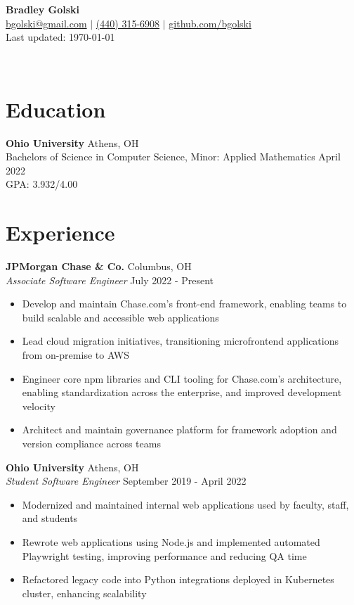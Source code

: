 \documentclass[11pt,a4paper]{article}
\newcommand{\sectionspace}{\vspace{1mm}}
\begin{document}
\begin{center}
	\begin{minipage}[t]{0.7\textwidth}
		{\Huge \textbf{Bradley Golski}}\\[5pt]
		\href{mailto:bgolski@gmail.com}{bgolski@gmail.com} $|$
		\href{tel:+4403156908}{(440) 315-6908} $|$
		\href{https://github.com/bgolski}{github.com/bgolski}\\[2pt]
		{\small\color{gray}Last updated: \today}
	\end{minipage}%
	\begin{minipage}[t]{0.3\textwidth}
		\raggedleft
		\\[2pt]
	\end{minipage}
\end{center}
\vspace{0.5mm}

\section{Education}
\sectionspace
\textbf{Ohio University} \hfill Athens, OH\\
Bachelors of Science in Computer Science, Minor: Applied Mathematics \hfill April 2022\\
GPA: 3.932/4.00

\section{Experience}
\sectionspace
\textbf{JPMorgan Chase \& Co.} \hfill Columbus, OH\\
\textit{Associate Software Engineer} \hfill July 2022 - Present
\begin{itemize}
	\item Develop and maintain Chase.com's front-end framework, enabling teams to build scalable and accessible web applications
	\item Lead cloud migration initiatives, transitioning microfrontend applications from on-premise to AWS
	\item Engineer core npm libraries and CLI tooling for Chase.com's architecture, enabling standardization across
	      the enterprise, and improved development velocity
	\item Architect and maintain governance platform for framework adoption and version compliance across teams
\end{itemize}

\noindent \textbf{Ohio University} \hfill Athens, OH\\
\textit{Student Software Engineer} \hfill September 2019 - April 2022
\begin{itemize}
	\item Modernized and maintained internal web applications used by faculty, staff, and students
	\item Rewrote web applications using Node.js and implemented automated Playwright testing, improving performance and reducing QA time
	\item Refactored legacy code into Python integrations deployed in Kubernetes cluster, enhancing scalability
\end{itemize}
\end{document}
